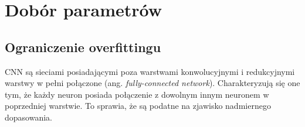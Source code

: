 \section{Dobór parametrów}
\label{dobor_parametrow}

\subsection{Ograniczenie overfittingu}
CNN są sieciami posiadającymi poza warstwami konwolucyjnymi i redukcyjnymi warstwy w pełni połączone (ang. \textit{fully-connected network}). Charakteryzują się one tym, że każdy neuron posiada połączenie z dowolnym innym neuronem w poprzedniej warstwie. To sprawia, że są podatne na zjawisko nadmiernego dopasowania. 
